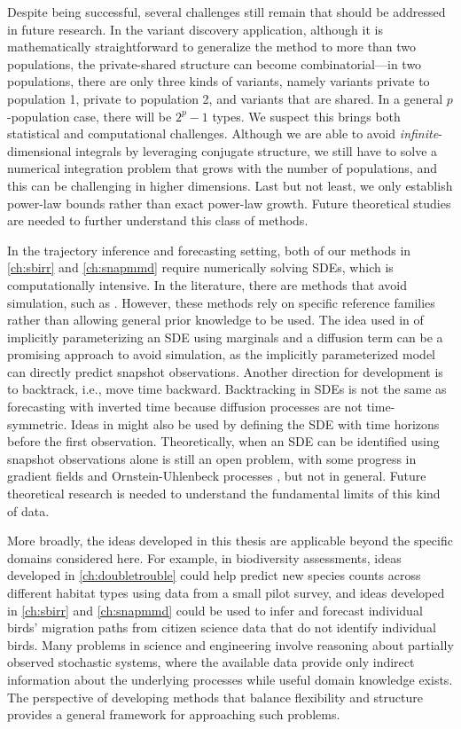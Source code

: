 Despite being successful, several challenges still remain that should be addressed in future research. In the variant discovery application, although it is mathematically straightforward to generalize the method to more than two populations, the private-shared structure can become combinatorial---in two populations, there are only three kinds of variants, namely variants private to population 1, private to population 2, and variants that are shared. In a general $p$-population case, there will be $2^p-1$ types. We suspect this brings both statistical and computational challenges. Although we are able to avoid \textit{infinite}-dimensional integrals by leveraging conjugate structure, we still have to solve a numerical integration problem that grows with the number of populations, and this can be challenging in higher dimensions. Last but not least, we only establish power-law bounds rather than exact power-law growth. Future theoretical studies are needed to further understand this class of methods.

In the trajectory inference and forecasting setting, both of our methods in \cref{ch:sbirr} and \cref{ch:snapmmd} require numerically solving SDEs, which is computationally intensive. In the literature, there are methods that avoid simulation, such as \citet{tong2023simulation, zhang2025learning}. However, these methods rely on specific reference families rather than allowing general prior knowledge to be used. The idea used in \citet{bartosh2025sde} of implicitly parameterizing an SDE using marginals and a diffusion term can be a promising approach to avoid simulation, as the implicitly parameterized model can directly predict snapshot observations. Another direction for development is to backtrack, i.e., move time backward. Backtracking in SDEs is not the same as forecasting with inverted time because diffusion processes are not time-symmetric. Ideas in \citet{bartosh2025sde} might also be used by defining the SDE with time horizons before the first observation. Theoretically, when an SDE can be identified using snapshot observations alone is still an open problem, with some progress in gradient fields \citep{lavenant2024toward} and Ornstein-Uhlenbeck processes \citep{guan2024identifying,zhang2025learning}, but not in general. Future theoretical research is needed to understand the fundamental limits of this kind of data.

More broadly, the ideas developed in this thesis are applicable beyond the specific domains considered here. For example, in biodiversity assessments, ideas developed in \cref{ch:doubletrouble} could help predict new species counts across different habitat types using data from a small pilot survey, and ideas developed in \cref{ch:sbirr} and \cref{ch:snapmmd} could be used to infer and forecast individual birds' migration paths from citizen science data that do not identify individual birds. Many problems in science and engineering involve reasoning about partially observed stochastic systems, where the available data provide only indirect information about the underlying processes while useful domain knowledge exists. The perspective of developing methods that balance flexibility and structure provides a general framework for approaching such problems.

